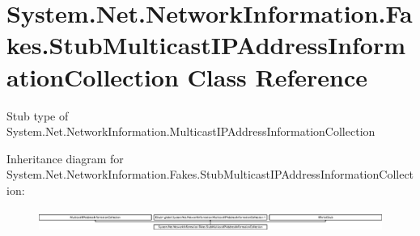 \hypertarget{class_system_1_1_net_1_1_network_information_1_1_fakes_1_1_stub_multicast_i_p_address_information_collection}{\section{System.\-Net.\-Network\-Information.\-Fakes.\-Stub\-Multicast\-I\-P\-Address\-Information\-Collection Class Reference}
\label{class_system_1_1_net_1_1_network_information_1_1_fakes_1_1_stub_multicast_i_p_address_information_collection}
}


Stub type of System.\-Net.\-Network\-Information.\-Multicast\-I\-P\-Address\-Information\-Collection 


Inheritance diagram for System.\-Net.\-Network\-Information.\-Fakes.\-Stub\-Multicast\-I\-P\-Address\-Information\-Collection\-:\begin{figure}[H]
\begin{center}
\leavevmode
\includegraphics[height=0.724919cm]{class_system_1_1_net_1_1_network_information_1_1_fakes_1_1_stub_multicast_i_p_address_information_collection}
\end{center}
\end{figure}
